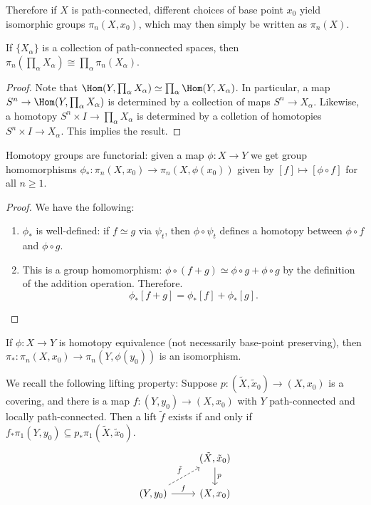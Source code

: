 \documentclass[ma3408.tex]{subfiles}
\begin{document}
\begin{Rem}
	Therefore if $X$ is path-connected, different choices of base point $x_0$ yield isomorphic groups $\pi_n(X,x_0)$, which may then simply be written as $\pi_n(X)$. 
\end{Rem}
\begin{Lem}
	If $\{ X_{\alpha} \}$ is a collection of path-connected spaces, then $\pi_n(\prod_{\alpha} X_{\alpha}) \cong \prod_{\alpha} \pi_n(X_{\alpha})$. 
\end{Lem}
\begin{proof}
	Note that $\Hom(Y,\prod_{\alpha} X_{\alpha}) \simeq \prod_{\alpha} \Hom(Y,X_{\alpha})$. In particular, a map $S^n \to \Hom(Y,\prod_{\alpha}X_{\alpha})$ is determined by a collection of maps $S^n \to X_{\alpha}$. Likewise, a homotopy $S^n \times I \to \prod_{\alpha} X_{\alpha}$ is determined by a colletion of homotopies $S^n \times I \to X_{\alpha}$. This implies the result. 
\end{proof}
\begin{Prop}
	Homotopy groups are functorial: given a map $\phi \colon X \to Y$ we get group homomorphisms $\phi_{\ast} \colon \pi_n(X,x_0) \to \pi_n(X,\phi(x_0))$ given by $[f] \mapsto [\phi \circ f]$ for all $n \ge 1$. 
\end{Prop}
\begin{proof}
We have the following:
	\begin{enumerate}
	\item $\phi_*$ is well-defined: if $f \simeq g$ via $\psi_t$, then $\phi \circ \psi_t$ defines a homotopy between $\phi \circ f$ and $\phi \circ g$. 
	\item This is a group homomorphism: $\phi \circ (f+g) \simeq \phi \circ g + \phi \circ g$ by the definition of the addition operation. Therefore. 
	\[
\phi_*[f+g] = \phi_*[f] + \phi_*[g]. 
	\]
\end{enumerate}
\end{proof}
\begin{exercise}{}{}
	If $\phi \colon X \to Y$ is homotopy equivalence (not necessarily base-point preserving), then $\pi_* \colon \pi_n(X,x_0) \to \pi_n(Y,\phi(y_0))$ is an isomorphism.  
\end{exercise}
\begin{Rem}
	We recall the following lifting property: Suppose $p \colon (\tilde X,\tilde x_0) \to (X,x_0)$ is a covering, and there is a map $f \colon (Y,y_0) \to (X,x_0)$ with $Y$ path-connected and locally path-connected. Then a lift $\tilde f$ exists if and only if $f_*\pi_1(Y,y_0) \subseteq p_*\pi_1(\tilde X,\tilde x_0)$. 
\[\begin{tikzcd}
	& {(\tilde X,\tilde x_0)} \\
	{(Y,y_0)} & {(X,x_0)}
	\arrow["f", from=2-1, to=2-2]
	\arrow["p",from=1-2, to=2-2]
	\arrow["{\tilde f}", dashed, from=2-1, to=1-2]
\end{tikzcd}\]

\end{Rem}
\end{document}
